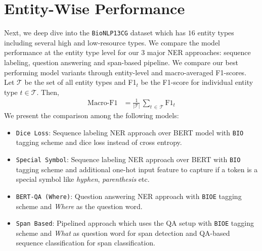 \section{Entity-Wise Performance}
Next, we deep dive into the \texttt{BioNLP13CG} dataset which has $16$ entity types including several high and low-resource types. We compare the model performance at the entity type level for our 3 major NER approaches: sequence labeling, question answering and span-based pipeline. We compare our best performing model variants through entity-level and macro-averaged F1-scores. Let $\mathcal{T}$ be the set of all entity types and F1$_t$ be the F1-score for individual entity type $t \in \mathcal{T}$. Then,
\begin{align*}
    \text{Macro-F1} &= \frac{1}{\mathcal{\vert\mathcal{T}\vert}}\,\sum_{t\,\in\,\mathcal{T}}{\text{F1}_t}
\end{align*}
We present the comparison among the following models:
\begin{itemize}
    \item \texttt{Dice Loss}: Sequence labeling NER approach over BERT model with \texttt{BIO} tagging scheme and dice loss instead of cross entropy.
    
    \item \texttt{Special Symbol}: Sequence labeling NER approach over BERT with \texttt{BIO} tagging scheme and additional one-hot input feature to capture if a token is a special symbol like \textit{hyphen}, \textit{parenthesis} etc.
    
    \item \texttt{BERT-QA (Where)}: Question answering NER approach with \texttt{BIOE} tagging scheme and \textit{Where} as the question word.
    
    \item \texttt{Span Based}: Pipelined approach which uses the QA setup with \texttt{BIOE} tagging scheme and \textit{What} as question word for span detection and QA-based sequence classification for span classification.
\end{itemize}

